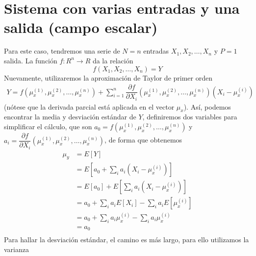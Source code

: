 \documentclass[a4paper, 10pt]{article}
\begin{document}
\section{Sistema con varias entradas y una salida (campo escalar)}
Para este caso, tendremos una serie de $N = n$ entradas $X_1,X_2,\dots,X_n$ y $P = 1$ salida.
La función $f:R^{n} \to R$ da la relación
\begin{equation}
    f(X_1,X_2,\dots,X_n) = Y
\end{equation}
Nuevamente, utilizaremos la aproximación de Taylor de primer orden
\begin{equation}
    \begin{split}
        Y = f(\mu_x^{(1)}, \mu_x^{(2)},\dots,\mu_x^{(n)}) +
        \sum_{i=1}^{n}{\dfrac{\partial f}{\partial X_i}
        \left(\mu_x^{(1)}, \mu_x^{(2)},\dots,\mu_x^{(n)}\right)(X_i-\mu^{(i)}_x)}
    \end{split}
\end{equation}
(nótese que la derivada parcial está aplicada en el vector $\mu_x$). Así, podemos encontrar la
media y desviación estándar de $Y$, definiremos dos variables para simplificar el cálculo, que son
$a_0 = f(\mu_x^{(1)}, \mu_x^{(2)},\dots,\mu_x^{(n)})$ y $a_i = \dfrac{\partial f}{\partial X_i}\left(\mu_x^{(1)}, \mu_x^{(2)},\dots,\mu_x^{(n)}\right)$,
de forma que obtenemos
\begin{equation}
    \begin{split}
        \mu_y & = E\left[Y\right] \\
        &=E\left[a_0 + \sum_{i}^{}{a_i(X_i-\mu_x^{(i)})}\right] \\
        &=E[a_0] + E\left[\sum_{i}^{}{a_i(X_i-\mu_x^{(i)})}\right] \\
        &=a_0 + \sum_{i}^{}a_iE\left[{X_i}\right] - \sum_{i}^{}a_iE\left[\mu_x^{(i)}\right] \\
        &=a_0 + \sum_{i}^{}a_i\mu_x^{(i)} - \sum_{i}^{}a_i\mu_x^{(i)} \\
        &=a_0 \\[2em]
    \end{split}
\end{equation}
Para hallar la desviación estándar, el camino es más largo, para ello utilizamos la varianza
\end{document}

